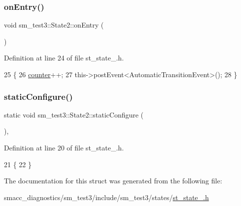 \subsubsection{\texorpdfstring{on\+Entry()}{onEntry()}}
{\footnotesize\ttfamily void sm\+\_\+test3\+::\+State2\+::on\+Entry (\begin{DoxyParamCaption}{ }\end{DoxyParamCaption})\hspace{0.3cm}{\ttfamily [inline]}}



Definition at line 24 of file st\+\_\+state\+\_.\+h.


\begin{DoxyCode}
25     \{
26         \hyperlink{namespacesm__test3_ab58afc60ebc0becda5535ba21c5a310a}{counter}++;
27         this->postEvent<AutomaticTransitionEvent>();
28     \}
\end{DoxyCode}
\mbox{\label{structsm__test3_1_1State2_a8e2e375b60d84b9963cda81d9733e9da}} 
\subsubsection{\texorpdfstring{static\+Configure()}{staticConfigure()}}
{\footnotesize\ttfamily static void sm\+\_\+test3\+::\+State2\+::static\+Configure (\begin{DoxyParamCaption}{ }\end{DoxyParamCaption})\hspace{0.3cm}{\ttfamily [inline]}, {\ttfamily [static]}}



Definition at line 20 of file st\+\_\+state\+\_.\+h.


\begin{DoxyCode}
21     \{
22     \}
\end{DoxyCode}


The documentation for this struct was generated from the following file\+:\begin{DoxyCompactItemize}
\item 
smacc\+\_\+diagnostics/sm\+\_\+test3/include/sm\+\_\+test3/states/\hyperlink{smacc__diagnostics_2sm__test3_2include_2sm__test3_2states_2st__state__2_8h}{st\+\_\+state\+\_.\+h}\end{DoxyCompactItemize}
